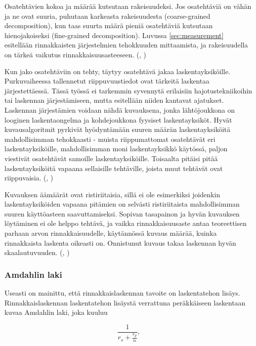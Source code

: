 Osatehtävien kokoa ja määrää kutsutaan rakeisuudeksi. Jos osatehtäviä on vähän
ja ne ovat suuria, puhutaan karkeasta rakeisuudesta (coarse-grained
decomposition), kun taas suurta määrä pieniä osatehtäviä kutsutaan
hienojakoiseksi (fine-grained decomposition). Luvussa \ref{sec:measurement}
esitellään rinnakkaisten järjestelmien tehokkuuden mittaamista, ja rakeisuudella
on tärkeä vaikutus rinnakkaisuusasteeseen. (\citealt{intro}, \citealt{rauber})

Kun jako osatehtäviin on tehty, täytyy osatehtävä jakaa laskentayksiköille.
Purkuvaiheessa tallennetut riippuvuustiedot ovat tärkeitä laskentaa
järjestettäessä. Tässä työssä ei tarkemmin syvennytä erilaisiin
hajotustekniikoihin tai laskennan järjestämiseen, mutta esitellään niiden
kantavat ajatukset. Laskennan järjestämien voidaan nähdä kuvauksena, jonka
lähtöjoukkona on looginen laskentaongelma ja kohdejoukkona fyysiset laskentayksiköt.
Hyvät kuvausalgoritmit pyrkivät hyödyntämään suuren määrän laskentayksiköitä
mahdollisimman tehokkaasti - muista riippumattomat osatehtävät eri
laskentayksiköille, mahdollisimman moni laskentayksikkö käytössä,
paljon viestivät osatehtävät samoille laskentayksiköille.
Toisaalta pitäisi pitää laskentayksiköitä vapaana sellaisille tehtäville,
joista muut tehtävät ovat riippuvaisia. (\citealt{intro}, \citealt{rauber})

Kuvauksen äämäärät ovat ristiriitaisia, sillä
ei ole esimerkiksi joidenkin laskentayksiköiden vapaana pitämien on selvästi
ristiriitaista mahdollisimman suuren käyttöasteen saavuttamiseksi. Sopivan
tasapainon ja hyvän kuvauksen löytäminen ei ole helppo tehtävä, ja vaikka
rinnakkaisuusaste antaa teoreettisen parhaan arvon rinnakkaisuudelle,
käytännössä kuvaus määrää, kuinka rinnakkaista laskenta oikeasti on.
Onnistunut kuvaus takaa laskennan hyvän skaalautuvuuden.
(\citealt{intro}, \citealt{rauber})

\subsubsection{Amdahlin laki}

Useasti on mainittu, että rinnakkaislaskennan tavoite on laskentatehon
lisäys. Rinnakkaislaskennan laskentatehon lisäystä verrattuna peräkkäiseen
laskentaan kuvaa Amdahlin laki, joka kuuluu

\begin{center}
\begin{equation}\frac{1}{r_s + \frac{r_p}{n}},\end{equation}
\end{center}

